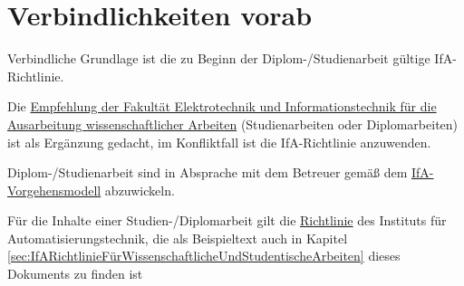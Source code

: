 
\chapter{Verbindlichkeiten vorab}
\label{sec:VerbindlichkeitenVorab}

\begin{compactitem}
  \item Verbindliche Grundlage ist die zu Beginn der Diplom-/Studienarbeit gültige IfA-Richtlinie.
  \item Die \href{http://www.et.tu-dresden.de/etit/uploads/media/EmpfehlungWissenschArbeiten2013_05.pdf}{Empfehlung der Fakultät Elektrotechnik und Informationstechnik für die Ausarbeitung wissenschaftlicher Arbeiten} (Studienarbeiten oder Diplomarbeiten) ist als Ergänzung gedacht, im Konfliktfall ist die IfA-Richtlinie anzuwenden.
  \item Diplom-/Studienarbeit sind in Absprache mit dem Betreuer gemäß dem \href{http://www.et.tu-dresden.de/ifa/index.php?id=331&L=1?keepThis=true}{IfA-Vorgehensmodell} abzuwickeln.
  \item Für die Inhalte einer Studien-/Diplomarbeit gilt die \href{http://www.et.tu-dresden.de/ifa/index.php?id=336&L=1?keepThis=true}{Richtlinie} des Instituts für Automatisierungstechnik, die als Beispieltext auch in Kapitel \ref{sec:IfARichtlinieFürWissenschaftlicheUndStudentischeArbeiten} dieses Dokuments zu finden ist
\end{compactitem}